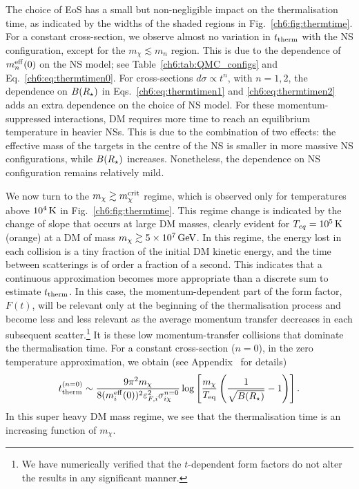 The choice of EoS has a small but non-negligible impact on the thermalisation time, as indicated by the widths of the shaded regions in Fig.~\ref{ch6:fig:thermtime}. 
For a constant cross-section, we observe almost no variation in $t_{\rm therm}$ with the NS configuration, except for the $m_\chi \lesssim m_n$ region. This is due to the dependence of $m_n^{\rm eff}(0)$ on the NS model; see Table~\ref{ch6:tab:QMC_configs} and Eq.~\ref{ch6:eq:thermtimen0}.
For cross-sections $d\sigma\propto t^n$, with $n=1,2$, the dependence on $B(R_\star)$ in Eqs.~\ref{ch6:eq:thermtimen1} and \ref{ch6:eq:thermtimen2} adds an extra dependence on the choice of NS model. For these momentum-suppressed interactions, DM requires more time to reach an equilibrium temperature in heavier NSs. This is due to the combination of two effects: the effective mass of the targets in the centre of the NS is smaller in more massive NS configurations, while $B(R_\star)$ increases. Nonetheless, the dependence on NS configuration remains relatively mild. 




We now turn to the $m_\chi \gtrsim m_\chi^{\rm crit}$ regime, which is observed only for temperatures above $10^4{\rm \,K}$ in Fig.~\ref{ch6:fig:thermtime}. This regime change is indicated by the change of slope that occurs at large DM masses, clearly evident for  $T_{eq}=10^5{\rm \,K}$ (orange)  at a DM of mass $m_\chi\gtrsim5\times10^7{\rm \,GeV}$.  
In this regime, the energy lost in each collision is a tiny fraction of the initial DM kinetic energy, and the time between scatterings is of order a fraction of a second. This indicates that a continuous approximation becomes more appropriate than a discrete sum to estimate $t_{\rm therm}$.
In this case, the momentum-dependent part of the form factor, $F(t)$, will be relevant only at the beginning of the thermalisation process and become less and less relevant as the average momentum transfer decreases in each subsequent scatter.\footnote{We have numerically verified that the $t$-dependent form factors do not alter the results in any significant manner.} It is these low momentum-transfer collisions that dominate the thermalisation time.
%
For a constant cross-section ($n=0$), in the zero temperature approximation, we obtain 
(see Appendix~ for details)
\begin{equation}
    \tthn{0} \sim \frac{9 \pi^2 m_\chi}{8 (\mbeff(0))^2 \kinFi^2 \sigma_{i\chi}^{n=0} }\log\left[\frac{m_\chi}{T_{\rm eq}}\left(\frac{1}{\sqrt{B(\Rstar)}}-1\right)\right]. %
\label{ch6:eq:tthemheavy0text}
\end{equation}
In this super heavy DM mass regime, we see that the thermalisation time is an increasing function of $m_\chi$. 


